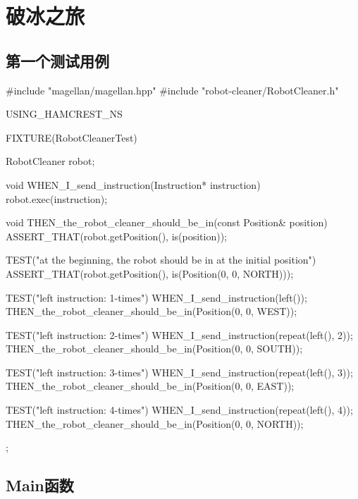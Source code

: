 \section{破冰之旅}

\begin{content}

\subsection{第一个测试用例}

\begin{leftbar}
\begin{c++}[caption={test/robot-cleaner/TestRobotCleaner.cpp}]
#include "magellan/magellan.hpp"
#include "robot-cleaner/RobotCleaner.h"

USING_HAMCREST_NS

FIXTURE(RobotCleanerTest)
{
    RobotCleaner robot;

    void WHEN_I_send_instruction(Instruction* instruction)
    {
        robot.exec(instruction);
    }

    void THEN_the_robot_cleaner_should_be_in(const Position& position)
    {
        ASSERT_THAT(robot.getPosition(), is(position));
    }

    TEST("at the beginning, the robot should be in at the initial position")
    {
        ASSERT_THAT(robot.getPosition(), is(Position(0, 0, NORTH)));
    }

    TEST("left instruction: 1-times")
    {
        WHEN_I_send_instruction(left());
        THEN_the_robot_cleaner_should_be_in(Position(0, 0, WEST));
    }

    TEST("left instruction: 2-times")
    {
        WHEN_I_send_instruction(repeat(left(), 2));
        THEN_the_robot_cleaner_should_be_in(Position(0, 0, SOUTH));
    }

    TEST("left instruction: 3-times")
    {
        WHEN_I_send_instruction(repeat(left(), 3));
        THEN_the_robot_cleaner_should_be_in(Position(0, 0, EAST));
    }

    TEST("left instruction: 4-times")
    {
        WHEN_I_send_instruction(repeat(left(), 4));
        THEN_the_robot_cleaner_should_be_in(Position(0, 0, NORTH));
    }
};
\end{c++}
\end{leftbar}

\subsection{Main函数}


\end{content}
